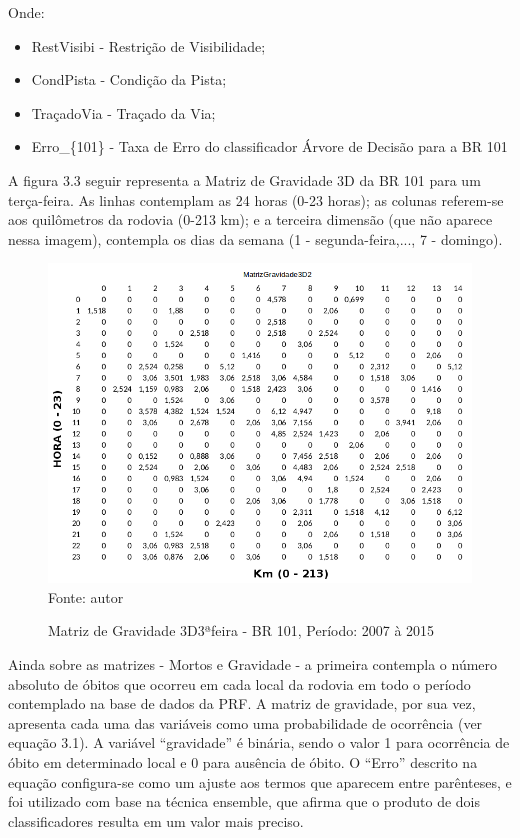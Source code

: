 Onde:

\begin{itemize}
	\item RestVisibi - Restrição de Visibilidade;
	\item CondPista  - Condição da Pista;
	\item TraçadoVia - Traçado da Via;
	\item Erro\_\{101\} - Taxa de Erro do classificador Árvore de Decisão para a BR 101
\end{itemize}
 
 \pagebreak
 
 A figura 3.3 seguir representa a Matriz de Gravidade 3D da BR 101 para um terça-feira. As linhas contemplam as 24 horas (0-23 horas); as colunas referem-se aos quilômetros da rodovia (0-213 km); e a terceira dimensão (que não aparece nessa imagem),  contempla os dias da semana (1 - segunda-feira,..., 7 - domingo). 
 
 
 \begin{figure}
 	\centering
 	\caption{Matriz de Gravidade 3D3ªfeira - BR 101, Período: 2007 à 2015}
 	\label{fig:MatrizGravidade3D2}
 	\includegraphics[width=0.7\linewidth]{Figuras/Metodologia/MatrizGravidade3D2.png}\\
 	\tiny Fonte: autor
 \end{figure}



Ainda sobre as matrizes - Mortos e Gravidade - a primeira contempla o número absoluto de óbitos que ocorreu em cada local da rodovia em todo o período contemplado na base de dados da PRF. A matriz de gravidade, por sua vez, apresenta cada uma das variáveis como uma probabilidade de ocorrência (ver equação 3.1). A variável ``gravidade'' é binária, sendo o valor 1 para ocorrência de óbito em determinado local e 0 para ausência de óbito. O ``Erro'' descrito na equação configura-se como um ajuste aos termos que aparecem entre parênteses, e foi utilizado com base na técnica ensemble, que afirma que o produto de dois classificadores resulta em um valor mais preciso.    

